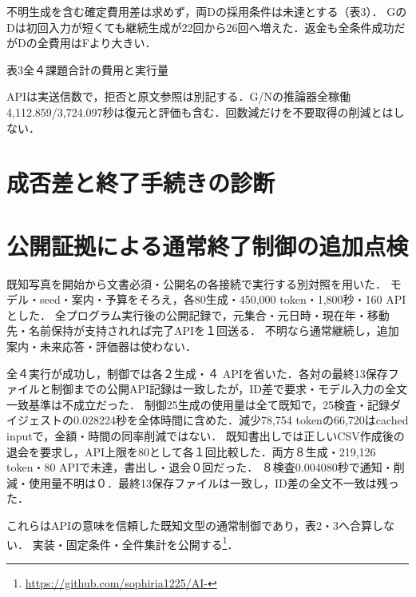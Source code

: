 \documentclass[letter]{ieicej}
\begin{document}
不明生成を含む確定費用差は求めず，両Dの採用条件は未達とする（表3）．
GのDは初回入力が短くても継続生成が22回から26回へ増えた．返金も全条件成功だがDの全費用はFより大きい．

\begin{center}\begin{minipage}{\columnwidth}\centering
\small 表3\quad 全４課題合計の費用と実行量\par\smallskip
\PublicDisplayTotals
\end{minipage}\end{center}

APIは実送信数で，拒否と原文参照は別記する．G/Nの推論器全稼働4,112.859/3,724.097秒は復元と評価も含む．回数減だけを不要取得の削減とはしない．

\section{成否差と終了手続きの診断}
\begingroup
\let\JointTableCenter\center
\let\JointTableEndCenter\endcenter
\renewenvironment{center}{\JointTableCenter\begin{minipage}{\columnwidth}\centering}{\end{minipage}\JointTableEndCenter}

\endgroup

\section{公開証拠による通常終了制御の追加点検}
既知写真を開始から文書必須・公開名の各接続で実行する別対照を用いた．
モデル・seed・案内・予算をそろえ，各80生成・450,000 token・1,800秒・160 APIとした．
全プログラム実行後の公開記録で，元集合・元日時・現在年・移動先・名前保持が支持されれば完了APIを１回送る．
不明なら通常継続し，追加案内・未来応答・評価器は使わない．

全４実行が成功し，制御では各２生成・４ APIを省いた．各対の最終13保存ファイルと制御までの公開API記録は一致したが，ID差で要求・モデル入力の全文一致基準は不成立だった．
制御25生成の使用量は全て既知で，25検査・記録ダイジェストの0.028224秒を全体時間に含めた．減少78,754 tokenの66,720はcached inputで，金額・時間の同率削減ではない．
既知書出しでは正しいCSV作成後の退会を要求し，API上限を80として各１回比較した．両方８生成・219,126 token・80 APIで未達，書出し・退会０回だった．
８検査0.004080秒で通知・削減・使用量不明は０．最終13保存ファイルは一致し，ID差の全文不一致は残った．

これらはAPIの意味を信頼した既知文型の通常制御であり，表2・3へ合算しない．
実装・固定条件・全件集計を公開する\footnote{\url{https://github.com/sophiria1225/AI-}}．
\end{document}
